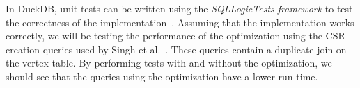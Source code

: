 



In DuckDB, unit tests can be written using the \textit{SQLLogicTests framework} to test the correctness of the implementation~\cite{duckdb-testing}. 
Assuming that the implementation works correctly, we will be testing the performance of the optimization using the CSR creation queries used by Singh et al.~\cite{sqlpgq-duckdb}. These queries contain a duplicate join on the vertex table.
By performing tests with and without the optimization, we should see that the queries using the optimization have a lower run-time. 








